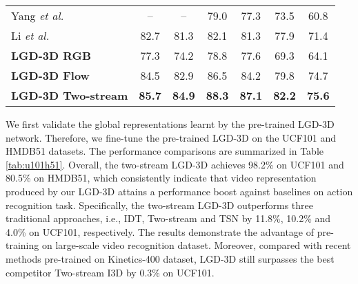 \documentclass[10pt,twocolumn,letterpaper]{article}
\begin{document}
\begin{table}
\begin{tabular}{l@{~}|c@{~~~}c|c@{~~~}c@{~~~}c@{~~~}c}
\begin{minipage}{3cm}\vspace{0.08cm} Yang \emph{et al.} \cite{yang2017spatio} \vspace{0.08cm}\end{minipage} & -- & -- & 79.0 & 77.3 & 73.5 & 60.8 \\
\begin{minipage}{3cm}\vspace{0.08cm} Li \emph{et al.} \cite{li2018recurrent} \vspace{0.08cm}\end{minipage} & 82.7 & 81.3 & 82.1 & 81.3 & 77.9 & 71.4 \\ \hline
\begin{minipage}{3cm}\vspace{0.08cm} \textbf{LGD-3D RGB} \vspace{0.08cm}\end{minipage} & 77.3 & 74.2 & 78.8 & 77.6 & 69.3 & 64.1 \\
\begin{minipage}{3cm}\vspace{0.08cm} \textbf{LGD-3D Flow} \vspace{0.08cm}\end{minipage} &  84.5 & 82.9 & 86.5 & 84.2 & 79.8 & 74.7 \\
\begin{minipage}{3cm}\vspace{0.08cm} \textbf{LGD-3D Two-stream} \vspace{0.08cm}\end{minipage} & \textbf{85.7} & \textbf{84.9} & \textbf{88.3} & \textbf{87.1} & \textbf{82.2} & \textbf{75.6} \\ \hline
\end{tabular}
\vspace{-0.15in}
\label{tab:detection}
\end{table}

We first validate the global representations learnt by the pre-trained LGD-3D network. Therefore, we fine-tune the pre-trained LGD-3D on the UCF101 and HMDB51 datasets. The performance comparisons are summarized in Table \ref{tab:u101h51}. Overall, the two-stream LGD-3D achieves 98.2\% on UCF101 and 80.5\% on HMDB51, which consistently indicate that video representation produced by our LGD-3D attains a performance boost against baselines on action recognition task. Specifically, the two-stream LGD-3D outperforms three traditional approaches, i.e., IDT, Two-stream and TSN by 11.8\%, 10.2\% and 4.0\% on UCF101, respectively. The results demonstrate the advantage of pre-training on large-scale video recognition dataset. Moreover, compared with recent methods pre-trained on Kinetics-400 dataset, LGD-3D still surpasses the best competitor Two-stream I3D by 0.3\% on UCF101.
\end{document}
